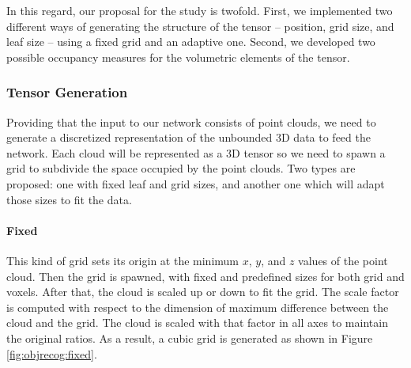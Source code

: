 In this regard, our proposal for the study is twofold. First, we implemented two different ways of generating the structure of the tensor -- position, grid size, and leaf size -- using a fixed grid and an adaptive one. Second, we developed two possible occupancy measures for the volumetric elements of the tensor.

\newpage

\subsubsection{Tensor Generation}
\label{cha:objrecog:sec:study:subsec:representation:subsubsec:tensor}

Providing that the input to our network consists of point clouds, we need to generate a discretized representation of the unbounded \acs{3D} data to feed the network. Each cloud will be represented as a \acs{3D} tensor so we need to spawn a grid to subdivide the space occupied by the point clouds. Two types are proposed: one with fixed leaf and grid sizes, and another one which will adapt those sizes to fit the data.

\paragraph{Fixed}

This kind of grid sets its origin at the minimum $x$, $y$, and $z$ values of the point cloud. Then the grid is spawned, with fixed and predefined sizes for both grid and voxels. After that, the cloud is scaled up or down to fit the grid. The scale factor is computed with respect to the dimension of maximum difference between the cloud and the grid. The cloud is scaled with that factor in all axes to maintain the original ratios. As a result, a cubic grid is generated as shown in Figure \ref{fig:objrecog:fixed}.

